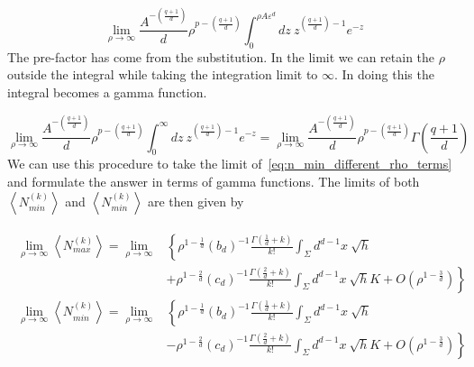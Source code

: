\documentclass[12pt]{article}
\newcommand{\be}{\begin{equation}}
\newcommand{\ee}{\end{equation}}
\begin{document}
\be\label{eq:incomplete_gamma_function}
\lim_{\rho\rightarrow\infty}\frac{A^{-\left(\frac{q+1}{d} \right)}}{d}\rho^{p-\left(\frac{q+1}{d} \right)}\int_{0}^{\rho A \varepsilon^d}dz\
z^{\left(\frac{q+1}{d} \right)-1}e^{-z}
\ee
The pre-factor has come from the substitution. In the limit we can retain the $\rho$ outside the integral while taking the integration limit to $\infty$. In doing this the integral becomes a gamma function.

\be\label{eq:gamma_function}
\lim_{\rho\rightarrow\infty}\frac{A^{-\left(\frac{q+1}{d} \right)}}{d}\rho^{p-\left(\frac{q+1}{d} \right)}\int_{0}^{\infty}dz\
z^{\left(\frac{q+1}{d} \right)-1}e^{-z}=\lim_{\rho\rightarrow\infty}
\frac{A^{-\left(\frac{q+1}{d} \right)}}{d}\rho^{p-\left(\frac{q+1}{d} \right)}\Gamma\left( \frac{q+1}{d} \right)
\ee
We can use this procedure to take the limit of~\eqref{eq:n_min_different_rho_terms} and formulate the answer in terms of gamma functions. The limits of both $\left\langle N_{min}^{(k)}\right\rangle$ and $\left\langle N_{min}^{(k)}\right\rangle$ are then given by

\begin{gather}\label{eq:nmax_nmin_final}
\begin{aligned}
\lim_{\rho\rightarrow\infty}\left\langle N_{max}^{(k)}\right\rangle = \lim_{\rho\rightarrow\infty} & \left\lbrace \rho^{1-\frac{1}{d}} \left(b_d\right)^{-1} \frac{\Gamma\left(\frac{1}{d}+k\right)}{k!}
\int_{\Sigma}d^{d-1}x\: \sqrt{h} \right.
 \\
 &  \left. +\rho^{1-\frac{2}{d}} \left(c_d\right)^{-1} \frac{\Gamma\left(\frac{2}{d}+k\right)}{k!}
\int_{\Sigma}d^{d-1}x\: \sqrt{h}K + O\left(\rho^{1-\frac{3}{d}} \right) \right\rbrace
\\
\lim_{\rho\rightarrow\infty}\left\langle N_{min}^{(k)}\right\rangle = \lim_{\rho\rightarrow\infty} & \left\lbrace \rho^{1-\frac{1}{d}} \left(b_d\right)^{-1} \frac{\Gamma\left(\frac{1}{d}+k\right)}{k!}
\int_{\Sigma}d^{d-1}x\: \sqrt{h} \right.
 \\
 &  \left. -\rho^{1-\frac{2}{d}} \left(c_d\right)^{-1} \frac{\Gamma\left(\frac{2}{d}+k\right)}{k!}
\int_{\Sigma}d^{d-1}x\: \sqrt{h}K + O\left(\rho^{1-\frac{3}{d}} \right) \right\rbrace
\\
\end{aligned}
\end{gather}
\end{document}
